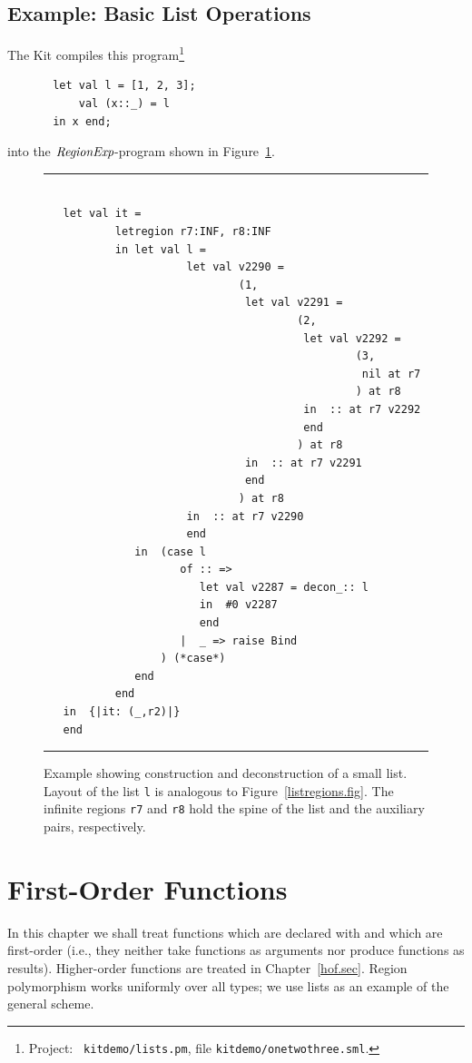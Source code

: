 \documentclass[12pt]{book}
\begin{document}
\section{Example: Basic List Operations}
\label{listexamples.sec}
The Kit compiles this program\footnote{Project: {\tt
    kitdemo/lists.pm}, file \texttt{kitdemo/onetwothree.sml}.}  
\begin{verbatim}
       let val l = [1, 2, 3];
           val (x::_) = l
       in x end;
\end{verbatim}       
into the $\hbox{\it RegionExp}$-program shown in Figure~\ref{listprint.fig}.
\begin{figure}
\hrule
\begin{verbatim}

   let val it = 
           letregion r7:INF, r8:INF 
           in let val l = 
                      let val v2290 = 
                              (1, 
                               let val v2291 = 
                                       (2, 
                                        let val v2292 = 
                                                (3, 
                                                 nil at r7
                                                ) at r8
                                        in  :: at r7 v2292
                                        end 
                                       ) at r8
                               in  :: at r7 v2291
                               end 
                              ) at r8
                      in  :: at r7 v2290
                      end 
              in  (case l 
                     of :: => 
                        let val v2287 = decon_:: l
                        in  #0 v2287
                        end 
                     |  _ => raise Bind
                  ) (*case*) 
              end  
           end
   in  {|it: (_,r2)|}
   end 
\end{verbatim}
\caption{Example showing construction and deconstruction of a small list.
Layout of the list {\tt l} is analogous to Figure~\ref{listregions.fig}.
The infinite regions {\tt r7} and {\tt r8} hold the spine of the list
and the auxiliary pairs, respectively.
}
\label{listprint.fig}
\medskip

\hrule
\end{figure}

\chapter{First-Order Functions}
In this chapter we shall treat functions which are declared with
 and which are first-order (i.e., they neither take functions
as arguments nor produce functions as results). Higher-order functions
are treated in Chapter~\ref{hof.sec}.
Region polymorphism works uniformly over all types; 
we use lists as an example of the general scheme. 
\end{document}
